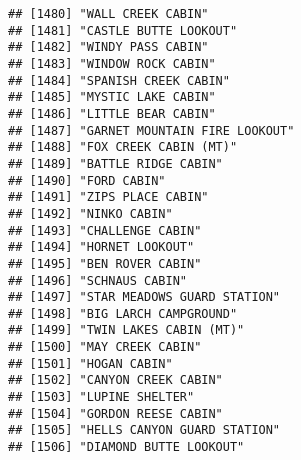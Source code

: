 \documentclass[
]{article}
\begin{document}
\begin{verbatim}
## [1480] "WALL CREEK CABIN"                                                                    
## [1481] "CASTLE BUTTE LOOKOUT"                                                                
## [1482] "WINDY PASS CABIN"                                                                    
## [1483] "WINDOW ROCK CABIN"                                                                   
## [1484] "SPANISH CREEK CABIN"                                                                 
## [1485] "MYSTIC LAKE CABIN"                                                                   
## [1486] "LITTLE BEAR CABIN"                                                                   
## [1487] "GARNET MOUNTAIN FIRE LOOKOUT"                                                        
## [1488] "FOX CREEK CABIN (MT)"                                                                
## [1489] "BATTLE RIDGE CABIN"                                                                  
## [1490] "FORD CABIN"                                                                          
## [1491] "ZIPS PLACE CABIN"                                                                    
## [1492] "NINKO CABIN"                                                                         
## [1493] "CHALLENGE CABIN"                                                                     
## [1494] "HORNET LOOKOUT"                                                                      
## [1495] "BEN ROVER CABIN"                                                                     
## [1496] "SCHNAUS CABIN"                                                                       
## [1497] "STAR MEADOWS GUARD STATION"                                                          
## [1498] "BIG LARCH CAMPGROUND"                                                                
## [1499] "TWIN LAKES CABIN (MT)"                                                               
## [1500] "MAY CREEK CABIN"                                                                     
## [1501] "HOGAN CABIN"                                                                         
## [1502] "CANYON CREEK CABIN"                                                                  
## [1503] "LUPINE SHELTER"                                                                      
## [1504] "GORDON REESE CABIN"                                                                  
## [1505] "HELLS CANYON GUARD STATION"                                                          
## [1506] "DIAMOND BUTTE LOOKOUT"                                                               

\end{verbatim}
\end{document}
